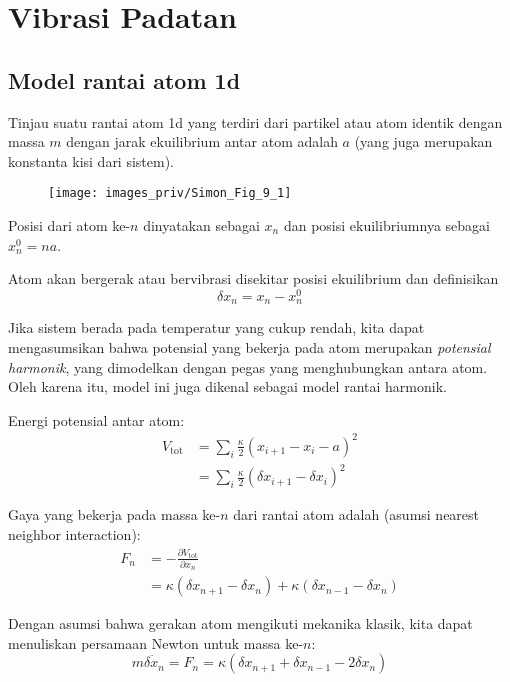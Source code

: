 \chapter{Vibrasi Padatan}
\section{Model rantai atom 1d}

Tinjau suatu rantai atom 1d yang terdiri dari partikel atau atom identik
dengan massa $m$ dengan jarak ekuilibrium antar atom adalah $a$
(yang juga merupakan konstanta kisi dari sistem).

\begin{figure}[h]
{\centering
\texttt{[image: images\_priv/Simon\_Fig\_9\_1]}
\par}
\end{figure}

Posisi dari atom ke-$n$ dinyatakan sebagai $x_{n}$ dan posisi
ekuilibriumnya sebagai $x^{0}_{n} = na$.

Atom akan bergerak atau bervibrasi disekitar posisi ekuilibrium dan
definisikan
\begin{equation*}
\delta x_{n} = x_{n} - x^{0}_{n}
\end{equation*}

Jika sistem berada pada temperatur yang cukup rendah, kita dapat
mengasumsikan bahwa potensial yang bekerja pada atom merupakan \textit{potensial
harmonik}, yang dimodelkan dengan pegas yang menghubungkan antara atom.
Oleh karena itu, model ini juga dikenal sebagai model rantai harmonik.

Energi potensial antar atom:
\begin{align*}
V_{\mathrm{tot}} & = \sum_{i} \frac{\kappa}{2} \left(
x_{i+1} - x_{i} - a \right)^2 \\
& = \sum_{i} \frac{\kappa}{2} \left(
\delta x_{i+1} - \delta x_{i} \right)^2
\end{align*}

Gaya yang bekerja pada massa ke-$n$ dari rantai atom adalah (asumsi
nearest neighbor interaction):
\begin{align*}
F_{n} & = -\frac{\partial V_{\mathrm{tot}}}{\partial x_{n}} \\
& = \kappa \left( \delta x_{n+1} - \delta x_{n} \right) +
\kappa \left( \delta x_{n-1} - \delta x_{n} \right)
\end{align*}

Dengan asumsi bahwa gerakan atom mengikuti mekanika klasik, kita dapat
menuliskan persamaan Newton untuk massa ke-$n$:
\begin{equation*}
m \ddot{\delta x_{n}} = F_{n} = \kappa \left(
    \delta x_{n+1} + \delta x_{n-1} - 2\delta x_{n}
    \right)    
\end{equation*}

